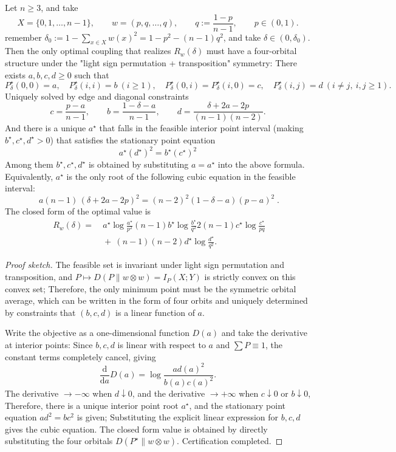 
\begin{theorem}\label{thm:pom-diagonal-rate-two-orbit-heavy-light-cubic}
Let \(n\ge 3\), and take
\[
X=\{0,1,\dots,n-1\},\qquad
w=(p,q,\dots,q),\qquad
q:=\frac{1-p}{n-1},\qquad p\in(0,1).
\]
remember
\(
\delta_0:=1-\sum_{x\in X}w(x)^2=1-p^2-(n-1)q^2
\), and take \(\delta\in(0,\delta_0)\).
Then the only optimal coupling that realizes \(R_w(\delta)\) must have a four-orbital structure under the "light sign permutation + transposition" symmetry:
There exists \(a,b,c,d\ge 0\) such that
\[
P^\star_\delta(0,0)=a,\quad
P^\star_\delta(i,i)=b\ (i\ge 1),\quad
P^\star_\delta(0,i)=P^\star_\delta(i,0)=c,\quad
P^\star_\delta(i,j)=d\ (i\ne j,\ i,j\ge 1).
\]
Uniquely solved by edge and diagonal constraints
\[
c=\frac{p-a}{n-1},\qquad
b=\frac{1-\delta-a}{n-1},\qquad
d=\frac{\delta+2a-2p}{(n-1)(n-2)}.
\]
And there is a unique \(a^\star\) that falls in the feasible interior point interval (making \(b^\star,c^\star,d^\star>0\)) that satisfies the stationary point equation
\[
\boxed{\;
a^\star(d^\star)^2=b^\star(c^\star)^2\;}
\]
Among them \(b^\star,c^\star,d^\star\) is obtained by substituting \(a=a^\star\) into the above formula.
Equivalently, \(a^\star\) is the only root of the following cubic equation in the feasible interval:
\[
\boxed{\;
a(n-1)\,(\delta+2a-2p)^2=(n-2)^2(1-\delta-a)(p-a)^2\; }.
\]
The closed form of the optimal value is
\[
\boxed{\;
\begin{aligned}
R_w(\delta)=&
\ a^\star\log\frac{a^\star}{p^2}
(n-1)b^\star\log\frac{b^\star}{q^2}
2(n-1)c^\star\log\frac{c^\star}{pq}\\
&\ +\ (n-1)(n-2)d^\star\log\frac{d^\star}{q^2}.
\end{aligned}}
\]
\end{theorem}
\begin{proof}[Proof sketch]
The feasible set is invariant under light sign permutation and transposition, and \(P\mapsto D(P\|w\otimes w)=I_P(X;Y)\) is strictly convex on this convex set;
Therefore, the only minimum point must be the symmetric orbital average, which can be written in the form of four orbits and uniquely determined by constraints that \((b,c,d)\) is a linear function of \(a\).
\par
Write the objective as a one-dimensional function \(D(a)\) and take the derivative at interior points:
Since \(b,c,d\) is linear with respect to \(a\) and \(\sum P\equiv 1\), the constant terms completely cancel, giving
\[
\frac{\mathrm d}{\mathrm d a}D(a)=\log\frac{a d(a)^2}{b(a)c(a)^2}.
\]
The derivative \(\to-\infty\) when \(d\downarrow 0\), and the derivative \(\to+\infty\) when \(c\downarrow 0\) or \(b\downarrow 0\),
Therefore, there is a unique interior point root \(a^\star\), and the stationary point equation \(ad^2=bc^2\) is given;
Substituting the explicit linear expression for \(b,c,d\) gives the cubic equation.
The closed form value is obtained by directly substituting the four orbitals \(D(P^\star\|w\otimes w)\). Certification completed.
\end{proof}

